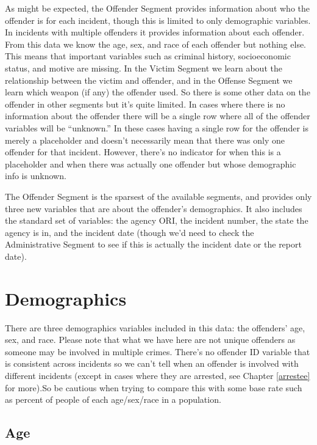 \documentclass[
  12pt,
  openany]{book}
\begin{document}
As might be expected, the Offender Segment provides information about who the offender is for each incident, though this is limited to only demographic variables. In incidents with multiple offenders it provides information about each offender. From this data we know the age, sex, and race of each offender but nothing else. This means that important variables such as criminal history, socioeconomic status, and motive are missing. In the Victim Segment we learn about the relationship between the victim and offender, and in the Offense Segment we learn which weapon (if any) the offender used. So there is some other data on the offender in other segments but it's quite limited. In cases where there is no information about the offender there will be a single row where all of the offender variables will be ``unknown.'' In these cases having a single row for the offender is merely a placeholder and doesn't necessarily mean that there was only one offender for that incident. However, there's no indicator for when this is a placeholder and when there was actually one offender but whose demographic info is unknown.

The Offender Segment is the sparsest of the available segments, and provides only three new variables that are about the offender's demographics. It also includes the standard set of variables: the agency ORI, the incident number, the state the agency is in, and the incident date (though we'd need to check the Administrative Segment to see if this is actually the incident date or the report date).

\section{Demographics}\label{demographics-1}

There are three demographics variables included in this data: the offenders' age, sex, and race. Please note that what we have here are not unique offenders as someone may be involved in multiple crimes. There's no offender ID variable that is consistent across incidents so we can't tell when an offender is involved with different incidents (except in cases where they are arrested, see Chapter \ref{arrestee} for more).So be cautious when trying to compare this with some base rate such as percent of people of each age/sex/race in a population.

\subsection{Age}\label{age-2}
\end{document}

